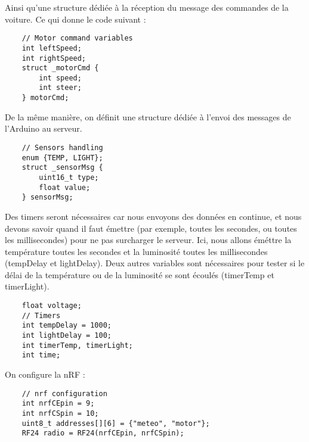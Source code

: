 Ainsi qu'une structure dédiée à la réception du message des commandes
de la voiture. Ce qui donne le code suivant :

\bigbreak
\begin{DDbox}{\linewidth}
\begin{lstlisting}
	// Motor command variables
	int leftSpeed;
	int rightSpeed;
	struct _motorCmd {
		int speed;
		int steer;
	} motorCmd;

\end{lstlisting}
\end{DDbox}

De la même manière, on définit une structure dédiée à l'envoi des messages
de l'Arduino au serveur.

\bigbreak
\begin{DDbox}{\linewidth}
\begin{lstlisting}
	// Sensors handling
	enum {TEMP, LIGHT};
	struct _sensorMsg {
		uint16_t type;
		float value;
	} sensorMsg;

\end{lstlisting}
\end{DDbox}

Des timers seront nécessaires car nous envoyons des données en continue, et nous devons
savoir quand il faut émettre (par exemple, toutes les secondes, ou toutes les millisecondes)
pour ne pas surcharger le serveur. Ici, nous allons éméttre la température toutes les secondes
et la luminosité toutes les millisecondes (tempDelay et lightDelay). 
Deux autres variables sont nécessaires pour tester si le délai de la température ou de la
luminosité se sont écoulés (timerTemp et timerLight).

\bigbreak
\begin{DDbox}{\linewidth}
\begin{lstlisting}
	float voltage;
	// Timers
	int tempDelay = 1000;
	int lightDelay = 100;
	int timerTemp, timerLight;
	int time;

\end{lstlisting}
\end{DDbox}

On configure la nRF :

\bigbreak
\begin{DDbox}{\linewidth}
\begin{lstlisting}
	// nrf configuration
	int nrfCEpin = 9;
	int nrfCSpin = 10;
	uint8_t addresses[][6] = {"meteo", "motor"};
	RF24 radio = RF24(nrfCEpin, nrfCSpin);

\end{lstlisting}
\end{DDbox}



